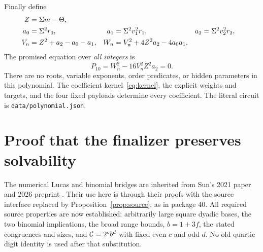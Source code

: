 \documentclass[11pt,letterpaper]{article}
\theoremstyle{definition}\newtheorem{definition}[theorem]{Definition}
\newcommand{\file}[1]{{\small\nolinkurl{#1}}}
\begin{document}
Finally define
\begin{align}
Z&=\Sigma m-\Theta,\notag\\
a_0&=\Sigma^2r_0,&a_1&=\Sigma^2v_1^2r_1,&a_2&=\Sigma^2v_2^2r_2,\notag\\
V_n&=Z^2+a_2-a_0-a_1,&W_n&=V_n^2+4Z^2a_2-4a_0a_1.
\label{eq:tennorm}
\end{align}
The promised equation over \emph{all integers} is
\begin{equation}
\boxed{\quad P_{10}=W_n^2-16V_n^2Z^2a_2=0.\quad}
\label{eq:tenfinal}
\end{equation}
There are no roots, variable exponents, order predicates, or hidden
parameters in this polynomial. The coefficient kernel~\eqref{eq:kernel},
the explicit weights and targets, and the four fixed payloads determine
every coefficient. The literal circuit is \file{data/polynomial.json}.

\section{Proof that the finalizer preserves solvability}
\label{sec:tenproof}

The numerical Lucas and binomial bridges are inherited from Sun's 2021
paper and 2026 preprint \cite{sun2021,sun2026}. Their use here is through
their proofs with the source interface replaced by
Proposition~\ref{prop:source}, as in package 40. All required source properties
are now established: arbitrarily large square dyadic bases, the two
binomial implications, the broad range bounds, $b=1+3f$, the stated
congruences and sizes, and $\mathcal C=2^c b^d$ with fixed even $c$ and odd $d$.
No old quartic digit identity is used after that substitution.
\end{document}
